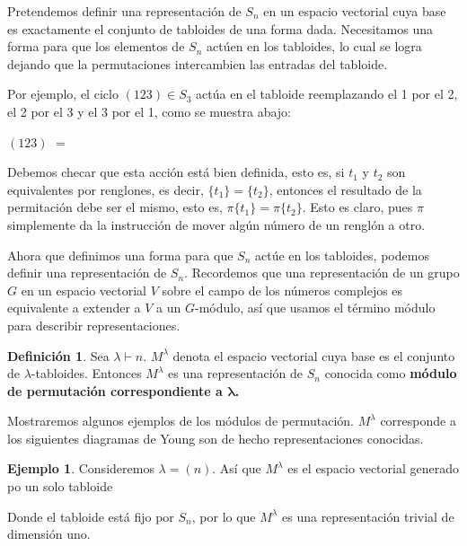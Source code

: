 \documentclass[12pt]{book}
\theoremstyle{definition}
\newtheorem{definition}[theorem]{Definición}
\newtheorem{example}[theorem]{Ejemplo}
\newcounter{in}
\newcounter{ini}
\begin{document}
Pretendemos definir una representación de $S_{n}$ en un espacio
vectorial cuya base es exactamente el conjunto de tabloides de una
forma dada. Necesitamos una forma para que los elementos de $S_{n}$
actúen en los tabloides, lo cual se logra dejando que la permutaciones intercambien las entradas del
tabloide.

Por ejemplo, el ciclo $(123)\in S_{3}$ actúa en el tabloide
reemplazando el 1 por el 2, el 2 por el 3 y el 3 por el 1, como se
muestra abajo:
\begin{center}
  $(123)$
  \quad$=$\quad
\end{center}

Debemos checar que esta acción está bien definida, esto es, si $t_{1}$
y $t_{2}$ son equivalentes por renglones, es decir,
$\{t_{1}\}=\{t_{2}\}$, entonces el resultado de la permitación debe
ser el mismo, esto es, $\pi\{t_{1}\}=\pi\{t_{2}\}$. Esto es claro,
pues $\pi$ simplemente da la instrucción de mover algún número de un
renglón a otro.

Ahora que definimos una forma para que $S_{n}$ actúe en los tabloides,
podemos definir una representación de $S_{n}$. Recordemos que una
representación de un grupo $G$ en un espacio vectorial $V$ sobre el
campo de los números complejos es equivalente a extender a $V$ a un $G$-módulo,
así que usamos el término módulo para describir representaciones.

\begin{definition}
  Sea $\lambda\vdash n$. $M^{\lambda}$ denota el espacio vectorial
  cuya base es el conjunto de $\lambda$-tabloides. Entonces
  $M^{\lambda}$ es una representación de $S_{n}$ conocida como \textbf{módulo
  de permutación correspondiente a $\boldsymbol{\lambda}$.}
\end{definition}

Mostraremos algunos ejemplos de los módulos de
permutación. $M^{\lambda}$ corresponde a los siguientes diagramas de
Young son de hecho representaciones conocidas.

\begin{center}
   \qquad
  \qquad
\end{center}

\begin{example}
  Consideremos $\lambda=(n)$. Así que $M^{\lambda}$ es el espacio
  vectorial generado po un solo tabloide 
  \begin{center}
  \end{center}
Donde el tabloide está fijo por $S_{n}$, por lo que $M^{\lambda}$ es
una representación trivial de dimensión uno.
\end{example}
\end{document}
